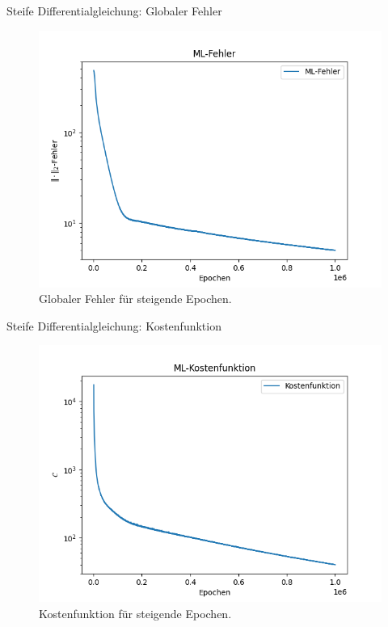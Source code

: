 \begin{frame}{Steife Differentialgleichung: Globaler Fehler}
    \begin{figure}
        \centering
        \includegraphics[scale=0.5]{images/Stiff_plots/stiffML_error_}
        \caption{Globaler Fehler für steigende Epochen.}
        \label{fig:stiff-error}
    \end{figure}
\end{frame}

\begin{frame}{Steife Differentialgleichung: Kostenfunktion}
    \begin{figure}
        \centering
        \includegraphics[scale=0.5]{images/Stiff_plots/stiffML_Loss_}
        \caption{Kostenfunktion für steigende Epochen.}
        \label{fig:stiff-loss}
    \end{figure}
\end{frame}


